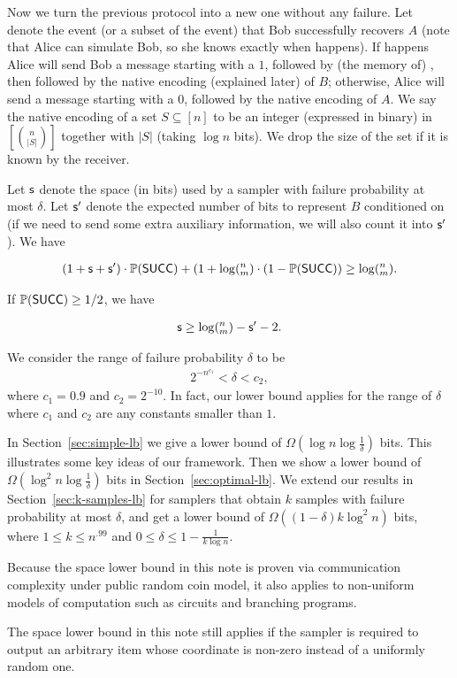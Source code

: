 Now we turn the previous protocol into a new one without any failure. Let \success denote the event (or a subset of the event) that Bob successfully recovers $A$ (note that Alice can simulate Bob, so she knows exactly when \success happens). If \success happens Alice will send Bob a message starting with a $1$, followed by (the memory of) \samp, then followed by the native encoding (explained later) of $B$; otherwise, Alice will send a message starting with a $0$, followed by the native encoding of $A$. We say the native encoding of a set $S\subseteq [n]$ to be an integer (expressed in binary) in $[{n \choose |S|}]$ together with $|S|$ (taking $\log n$ bits). We drop the size of the set if it is known by the receiver.

\begin{lemma} \label{lemma:lb-meta}
  Let $\textsf{s}$ denote the space (in bits) used by a sampler with failure probability at most $\delta$. Let $\textsf{s}'$ denote the expected number of bits to represent $B$ conditioned on \success (if we need to send some extra auxiliary information, we will also count it into $\textsf{s}'$). We have 
  
  \begin{align}
  (1+\textsf{s}+\textsf{s}')\cdot \operatorname*{\mathbb{P}}(\textsf{SUCC})+(1+\log(^n_m) \cdot (1-\operatorname*{\mathbb{P}}(\textsf{SUCC})) \ge \log (^n_m).
  \end{align} 
  
  If $\operatorname*{\mathbb{P}}(\textsf{SUCC})\ge 1/2$, we have 
  
  \begin{align} \label{eqn:lb-meta}
  \textsf{s}\ge \log (^n_m) - \textsf{s}' - 2.
  \end{align} 
\end{lemma}

We consider the range of failure probability $\delta$ to be 
\begin{align} \label{eqn:delta-range}
2^{-n^{c_1}}<\delta<c_2,
\end{align}
where $c_1=0.9$ and $c_2=2^{-10}$. In fact, our lower bound applies for the range of $\delta$ where $c_1$ and $c_2$ are any constants smaller than $1$. 

In Section~\ref{sec:simple-lb} we give a lower bound of $\Omega(\log n \log \frac{1}{\delta})$ bits. This illustrates some key ideas of our framework. Then we show a lower bound of $\Omega(\log^2 n \log \frac{1}{\delta})$ bits in Section~\ref{sec:optimal-lb}.
We extend our results in Section~\ref{sec:k-samples-lb} for samplers that obtain $k$ samples with failure probability at most $\delta$, and get a lower bound of $\Omega((1-\delta)k\log^2 n)$ bits, where $1\le k \le n^{.99}$ and $0\le \delta \le 1-\frac{1}{k\log n}$.

\begin{remark}
  Because the space lower bound in this note is proven via communication complexity under public random coin model, it also applies to non-uniform models of computation such as circuits and branching programs.  
\end{remark}

\begin{remark}
  The space lower bound in this note still applies if the sampler is required to output an arbitrary item whose coordinate is non-zero instead of a uniformly random one. 
\end{remark}